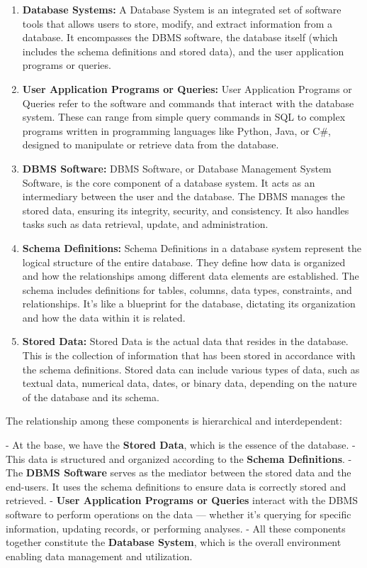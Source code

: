 \begin{enumerate}
    \item \textbf{Database Systems:} A Database System is an integrated set of software tools that allows users to store, modify, and extract information from a database. It encompasses the DBMS software, the database itself (which includes the schema definitions and stored data), and the user application programs or queries.
    \item \textbf{User Application Programs or Queries:} User Application Programs or Queries refer to the software and commands that interact with the database system. These can range from simple query commands in SQL to complex programs written in programming languages like Python, Java, or C#, designed to manipulate or retrieve data from the database.
    \item \textbf{DBMS Software:} DBMS Software, or Database Management System Software, is the core component of a database system. It acts as an intermediary between the user and the database. The DBMS manages the stored data, ensuring its integrity, security, and consistency. It also handles tasks such as data retrieval, update, and administration.
    \item \textbf{Schema Definitions:} Schema Definitions in a database system represent the logical structure of the entire database. They define how data is organized and how the relationships among different data elements are established. The schema includes definitions for tables, columns, data types, constraints, and relationships. It's like a blueprint for the database, dictating its organization and how the data within it is related.
    \item \textbf{Stored Data:} Stored Data is the actual data that resides in the database. This is the collection of information that has been stored in accordance with the schema definitions. Stored data can include various types of data, such as textual data, numerical data, dates, or binary data, depending on the nature of the database and its schema.
\end{enumerate}


The relationship among these components is hierarchical and interdependent:

- At the base, we have the \textbf{Stored Data}, which is the essence of the database.
- This data is structured and organized according to the \textbf{Schema Definitions}.
- The \textbf{DBMS Software} serves as the mediator between the stored data and the end-users. It uses the schema definitions to ensure data is correctly stored and retrieved.
- \textbf{User Application Programs or Queries} interact with the DBMS software to perform operations on the data — whether it's querying for specific information, updating records, or performing analyses.
- All these components together constitute the \textbf{Database System}, which is the overall environment enabling data management and utilization.

